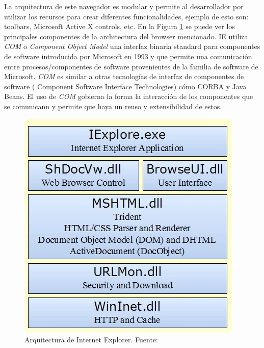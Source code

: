     La arquitectura de este navegador es modular y permite al desarrollador por utilizar los recursos para crear diferentes funcionalidades, ejemplo de esto son: toolbars, Microsoft Active X controls, etc. En la Figura \ref{fig:archIE} \cite{IEArch} se puede ver los principales componentes de la architectura del browser mencionado. IE utiliza \textit{COM} o \textit{Component Object Model} una interfaz binaria standard para componentes de software introducida por Microsoft en 1993 y que permite una comunicación entre procesos/componentes de software provenientes de la familia de software de Microsoft. \textit{COM} es similar a otras tecnologías de interfaz de componentes de software ( Component Software Interface Technologies) cómo CORBA y Java Beans. El uso de \textit{COM} gobierna la forma la interacción de los componentes que se comunicann y permite que haya un reuso y extensibilidad de estos.
            
	\begin{figure}[h!t]
	    \centering
		\includegraphics[scale=0.65]{figures/IEArch.jpg}
		\caption{Arquitectura de Internet Explorer. Fuente: \cite{IEArchImg}}
		\label{fig:archIE}
    \end{figure}

